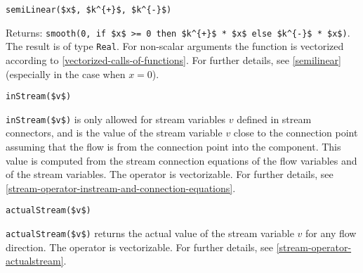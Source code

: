 \begin{operatordefinition}[semiLinear]
\begin{synopsis}\begin{lstlisting}
semiLinear($x$, $k^{+}$, $k^{-}$)
\end{lstlisting}\end{synopsis}
\begin{semantics}
Returns: \lstinline!smooth(0, if $x$ >= 0 then $k^{+}$ * $x$ else $k^{-}$ * $x$)!.  The result is of type \lstinline!Real!.  For non-scalar arguments the function is vectorized according to \cref{vectorized-calls-of-functions}.  For further details, see \cref{semilinear} (especially in the case when $x = 0$).
\end{semantics}
\end{operatordefinition}

\begin{operatordefinition}[inStream]
\begin{synopsis}\begin{lstlisting}
inStream($v$)
\end{lstlisting}\end{synopsis}
\begin{semantics}
\lstinline!inStream($v$)! is only allowed for stream variables $v$ defined in stream connectors, and is the value of the stream variable $v$ close to the connection point assuming that the flow is from the connection point into the component.  This value is computed from the stream connection equations of the flow variables and of the stream variables.  The operator is vectorizable.  For further details, see \cref{stream-operator-instream-and-connection-equations}.
\end{semantics}
\end{operatordefinition}

\begin{operatordefinition}[actualStream]
\begin{synopsis}\begin{lstlisting}
actualStream($v$)
\end{lstlisting}\end{synopsis}
\begin{semantics}
\lstinline!actualStream($v$)! returns the actual value of the stream variable $v$ for any flow direction.  The operator is vectorizable.  For further details, see \cref{stream-operator-actualstream}.
\end{semantics}
\end{operatordefinition}

